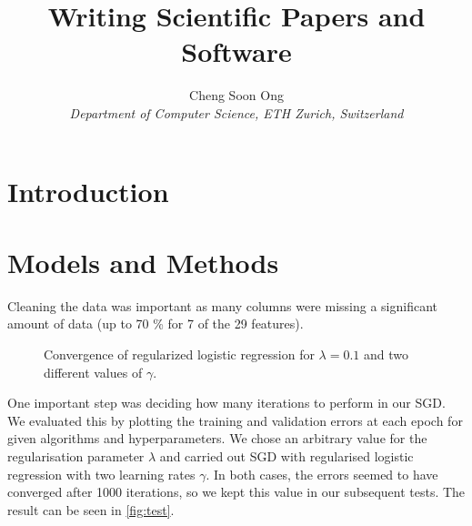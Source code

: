 \documentclass[10pt,conference,compsocconf]{IEEEtran}
\begin{document}
\title{Writing Scientific Papers and Software}

\author{
  Cheng Soon Ong\\
  \textit{Department of Computer Science, ETH Zurich, Switzerland}
}
\maketitle

\begin{abstract}
\end{abstract}

\section{Introduction}

\section{Models and Methods}

Cleaning the data was important as many columns were missing a significant amount of data (up to 70 \% for 7 of the 29 features).

\begin{figure}
  \centering
  
  \vspace{-3mm}
  \caption{Convergence of regularized logistic regression for $\lambda = 0.1$ and two
  different values of $\gamma$.}
  \label{fig:test}
\end{figure}


One important step was deciding how many iterations to perform in our
SGD. We evaluated this by plotting the training and validation errors
at each epoch for given algorithms and hyperparameters.
We chose an arbitrary value for the regularisation parameter $\lambda$ and carried out SGD with regularised logistic regression with two learning rates $\gamma$.
In both cases, the errors seemed to have converged after 1000 iterations, so we kept this value in our subsequent tests.
The result can
be seen in \autoref{fig:test}.
\end{document}
